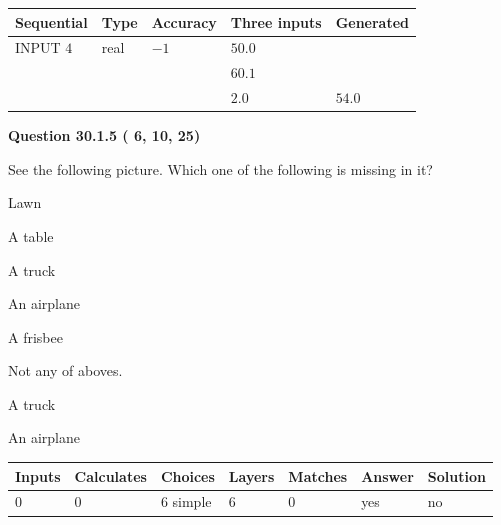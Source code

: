 \documentclass[12pt]{article}
\begin{document}
   
  
  
\noindent\begin{tabular}{|l|l|l|l|l|}
\hline
 Sequential & Type & Accuracy & Three inputs & Generated \\ 
\hline
 
 
  INPUT $           4$ & real & $          -1 $ & $
 50.0
  $ & \\
  & & &  $
 60.1
  $ & \\
  & & &  $
 2.0
 $ & $ 54.0 $ 
 \\  \hline  
 \end{tabular}
   
   
  
\vspace{0.2in}
  
{\textbf{\Large{Question
30.1.5 
 (          6,         10,         25)
}}}
  
  
See the following picture.
Which one of the following is missing in it?
 
 
Lawn
 
 
A table
 
 
A truck
 
 
An airplane
 
 
A frisbee
 
 
  Not any of aboves.
 
 
\noindent{}
 
 
A truck
 
 
An airplane
 
 
\noindent{}
 
 
 
\vspace{0.3in}
   
   
   
   
\noindent\begin{tabular}{|l|l|l|l|l|l|l|}
 \hline
Inputs & Calculates & Choices & Layers & Matches & Answer & Solution \\ \hline
           0 & 
           0 & 
           6
  simple  
  & 
           6 & 
           0 & 
  yes & 
  no 
  \\ \hline
 \end{tabular}
   
\end{document}

